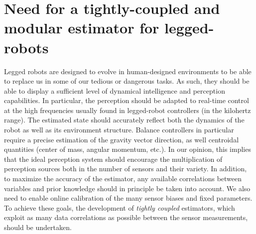 





\section{Need for a tightly-coupled and modular estimator for legged-robots}

Legged robots are designed to evolve in human-designed environments to be able to replace us in some of our tedious or dangerous tasks. As such, they should be able to
display a sufficient level of dynamical intelligence and perception capabilities. 
In particular, the perception should be adapted to real-time control at the high frequencies usually found in legged-robot controllers (in the kilohertz range).
The estimated state should accurately reflect both the dynamics of the robot as well as its environment structure. Balance controllers in particular require a precise estimation of the gravity vector direction, as well centroidal quantities (center of mass, angular momentum, etc.).
In our opinion, this implies that the ideal perception system should encourage the multiplication of perception sources both in the number of sensors and their variety.
In addition, to maximize the accuracy of the estimator, any available correlations between variables and prior knowledge should in principle be taken into account. 
We also need to enable online calibration of the many sensor biases and fixed parameters. To achieve these goals, the development of \textit{tightly coupled} estimators, 
which exploit as many data correlations as possible between the sensor measurements, should be undertaken.

